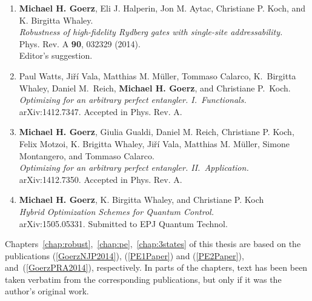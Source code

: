 \begin{enumerate}
  \item
  {\bf Michael H. Goerz}, Eli J. Halperin, Jon M. Aytac, Christiane P. Koch, and K.  Birgitta Whaley. \\
  {\it Robustness of high-fidelity Rydberg gates with single-site addressability.} \\
  Phys. Rev. A {\bf 90}, 032329 (2014). \\
  Editor's suggestion.
  \label{GoerzPRA2014}

  \item
  Paul Watts, Ji\v{r}\'i Vala, Matthias M. M\"uller, Tommaso Calarco, K.\ Birgitta Whaley, Daniel M.\ Reich, {\bf Michael H. Goerz}, and Christiane P.\ Koch. \\
  {\it Optimizing for an arbitrary perfect entangler. I.~Functionals.} \\
  arXiv:1412.7347. Accepted in Phys. Rev. A.
  \label{PE1Paper}

  \item
  {\bf Michael H. Goerz}, Giulia Gualdi, Daniel M. Reich, Christiane P. Koch, Felix Motzoi, K. Brigitta Whaley, Ji\v{r}\'i Vala, Matthias M. M\"uller, Simone Montangero, and Tommaso Calarco. \\
  {\it Optimizing for an arbitrary perfect entangler. II.~Application.} \\
  arXiv:1412.7350. Accepted in Phys. Rev. A.
  \label{PE2Paper}

  \item
  {\bf Michael H. Goerz}, K. Birgitta Whaley, and Christiane P. Koch\\
  {\it Hybrid Optimization Schemes for Quantum Control.} \\
  arXiv:1505.05331. Submitted to EPJ Quantum Technol.
  \label{HybridPaper}

\end{enumerate}

\noindent
Chapters~\ref{chap:robust},~\ref{chap:pe},~\ref{chap:3states} of this thesis are
based on the publications (\ref{GoerzNJP2014}), (\ref{PE1Paper}) and
(\ref{PE2Paper}), and~(\ref{GoerzPRA2014}), respectively.
In parts of the chapters, text has been been taken verbatim from the
corresponding publications, but only if it was the author's
original work.
